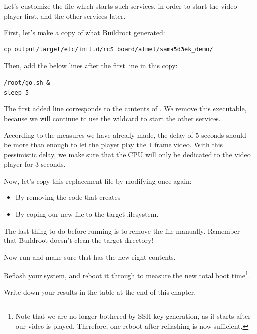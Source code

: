 Let's customize the  file which starts such
services, in order to start the video player first, and the other services
later.

First, let's make a copy of what Buildroot generated:

\begin{verbatim}
cp output/target/etc/init.d/rcS board/atmel/sama5d3ek_demo/
\end{verbatim}

Then, add the below lines after the first line in this copy:

\begin{verbatim}
/root/go.sh &
sleep 5
\end{verbatim}

The first added line corresponds to the contents of
. We remove this executable, because
we will continue to use the  wildcard to start the
other services.

According to the measures we have already made, the delay of 5 seconds
should be more than enough to let the player play the 1 frame video.
With this pessimistic delay, we make sure that the CPU will only be
dedicated to the video player for 3 seconds.

Now, let's copy this replacement  file by
modifying  once again:

\begin{itemize}
\item By removing the code that creates 
\item By coping our new  file to the target filesystem.
\end{itemize}

The last thing to do before running  is to remove the
 file manually. Remember that
Buildroot doesn't clean the target directory!

Now run  and make sure that
 has the new right contents.

Reflash your system, and reboot it through  to
measure the new total boot time\footnote{Note that we are no longer
bothered by SSH key generation,
as it starts after our video is played. Therefore, one reboot
after reflashing is now sufficient.}.

Write down your results in the table at the end of this chapter.

